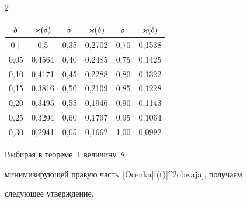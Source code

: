 \begin{multicols}{2}
\begin{center}
\tabcolsep=7pt

\begin{tabular}{|c|c||c|c||c|c|}

\hline

$\delta$ & $\varkappa(\delta)$ & $\delta $&$ \varkappa(\delta)$ &$ \delta$ & $\varkappa(\delta)$ \\

\hline

0+   & 0,5\hphantom{999}    & 0,35 & 0,2702 & 0,70 & 0,1538 \\


0,05 & 0,4564 & 0,40 & 0,2485 & 0,75 & 0,1425 \\


0,10 & 0,4171 & 0,45 & 0,2288 & 0,80 & 0,1322 \\


0,15 & 0,3816 & 0,50 & 0,2109 & 0,85 & 0,1228 \\


0,20 & 0,3495 & 0,55 & 0,1946 & 0,90 & 0,1143 \\


0,25 & 0,3204 & 0,60 & 0,1797 & 0,95 & 0,1064 \\


0,30 & 0,2941 & 0,65 & 0,1662 & 1,00 & 0,0992 \\

\hline

\end{tabular}

\end{center}

\vspace*{6pt}





\bigskip

\addtocounter{table}{1}



Выбирая в теореме~1 величину~$\theta$

минимизирующей правую часть~\eqref{Ocenka|f(t)|^2obwaja}, получаем

следующее утверждение.



\medskip



\noindent


\end{multicols}
